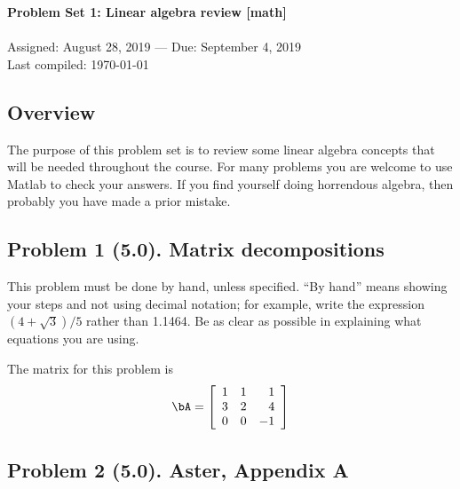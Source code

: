 \documentclass[11pt,titlepage,fleqn]{article}
\begin{document}

\begin{spacing}{1.2}
\centering
{\large \bf Problem Set 1: Linear algebra review [math]} \\
\cltag\ \\
Assigned: August 28, 2019 --- Due: September 4, 2019 \\
Last compiled: \today
\end{spacing}


\subsection*{Overview}

The purpose of this problem set is to review some linear algebra concepts that will be needed throughout the course. For many problems you are welcome to use Matlab to check your answers. If you find yourself doing horrendous algebra, then probably you have made a prior mistake.


\subsection*{Problem 1 (5.0). Matrix decompositions}

This problem must be done by hand, unless specified. ``By hand'' means showing your steps and not using decimal notation; for example, write the expression $(4 +\sqrt{3})/5$ rather than 1.1464.
Be as clear as possible in explaining what equations you are using.

\medskip\noindent
The matrix for this problem is
%
\begin{equation*}
\bA =  \left[ \begin{array}{rrr}
     1  &   1  &   1 \\
     3  &   2  &   4 \\
     0  &   0  &  -1 \\
\end{array} \right]
\end{equation*}




\subsection*{Problem 2 (5.0). Aster, Appendix A}
\end{document}
